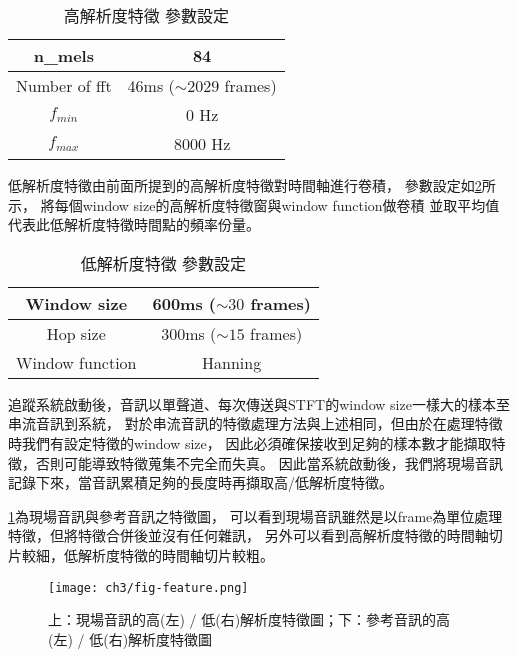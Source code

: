 \documentclass[class=NCU_thesis, crop=false]{standalone}
\begin{document}
\begin{table}[h]
    \centering
    \caption{高解析度特徵 參數設定}
    \label{table:table-high-resolution-feature-parameter-setting}
    \begin{tabular}{|c|c|}
        \hline
        \multicolumn{1}{|c|}{n\_mels} & \multicolumn{1}{|c|}{84}\\
        \hline
        Number of fft & 46ms ($\sim 2029$ frames)\\
        \hline
        $f_{min}$ & 0 Hz \\
        \hline
        $f_{max}$ & 8000 Hz \\
        \hline
    \end{tabular}
\end{table}

低解析度特徵由前面所提到的高解析度特徵對時間軸進行卷積，
參數設定如\cref{table:table-low-resolution-feature-parameter-setting}所示，
將每個window size的高解析度特徵窗與window function做卷積
並取平均值代表此低解析度特徵時間點的頻率份量。

\begin{table}[h]
    \centering
    \caption{低解析度特徵 參數設定}
    \label{table:table-low-resolution-feature-parameter-setting}
    \begin{tabular}{|c|c|}
        \hline
        \multicolumn{1}{|c|}{Window size} & \multicolumn{1}{|c|}{600ms ($\sim 30$ frames)}\\
        \hline
        Hop size & 300ms ($\sim 15$ frames)\\
        \hline
        Window function & Hanning \\
        \hline
    \end{tabular}
\end{table}

追蹤系統啟動後，音訊以單聲道、每次傳送與STFT的window size一樣大的樣本至串流音訊到系統，
對於串流音訊的特徵處理方法與上述相同，但由於在處理特徵時我們有設定特徵的window size，
因此必須確保接收到足夠的樣本數才能擷取特徵，否則可能導致特徵蒐集不完全而失真。
因此當系統啟動後，我們將現場音訊記錄下來，當音訊累積足夠的長度時再擷取高/低解析度特徵。

\cref{fig:fig-ch3-feature}為現場音訊與參考音訊之特徵圖，
可以看到現場音訊雖然是以frame為單位處理特徵，但將特徵合併後並沒有任何雜訊，
另外可以看到高解析度特徵的時間軸切片較細，低解析度特徵的時間軸切片較粗。

\begin{figure}[!hbt]
    \centering
    \texttt{[image: ch3/fig-feature.png]}
    \caption{上：現場音訊的高(左) / 低(右)解析度特徵圖；下：參考音訊的高(左) / 低(右)解析度特徵圖}
    \label{fig:fig-ch3-feature}
\end{figure}
\end{document}
